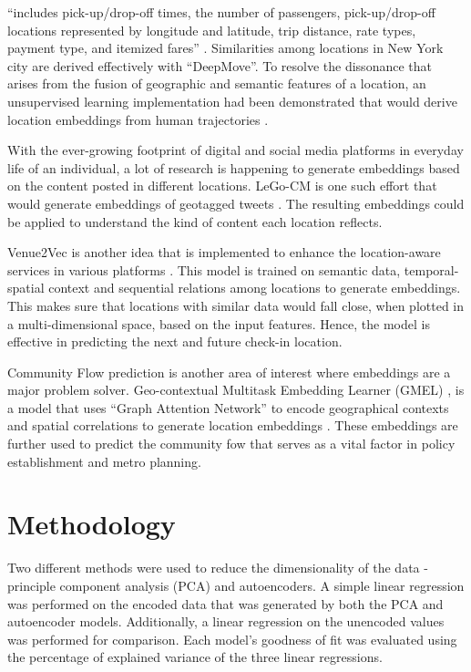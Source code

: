 \documentclass{article}
\begin{document}
“includes pick-up/drop-off times, the number of passengers, pick-up/drop-off locations 
represented by longitude and latitude, trip distance, rate types, payment type, and
itemized fares” \parencite{DeepMove}. Similarities among locations in New York city are 
derived effectively with “DeepMove”. To resolve the dissonance that arises from the 
fusion of geographic and semantic features of a location, an unsupervised learning 
implementation had been demonstrated that would derive location embeddings from human 
trajectories \parencite{DisentangledLocationEmbeddings}. 
\par With the ever-growing 
footprint of digital and social media platforms in everyday life of an individual, a
lot of research is happening to generate embeddings based on the content posted in 
different locations. LeGo-CM is one such effort that would generate embeddings of 
geotagged tweets \parencite{GeotaggedTweets}. The resulting embeddings could be 
applied to understand the kind of content each location reflects. 
\par Venue2Vec is another 
idea that is implemented to enhance the location-aware services in various platforms 
\parencite{Venue2Vec}. This model is trained on semantic data, temporal-spatial context 
and sequential relations among locations to generate embeddings. This makes sure that 
locations with similar data would fall close, when plotted in a multi-dimensional space,
based on the input features. Hence, the model is effective in predicting the next and  
future check-in location. 
\par Community Flow prediction is another area of interest where
embeddings are a major problem solver. Geo-contextual Multitask Embedding Learner (GMEL)
, is a model that uses “Graph Attention Network” to encode geographical contexts and 
spatial correlations to generate location embeddings \parencite{CommutingFlowPrediction}.
These embeddings are further used to predict the community fow that serves as a vital
factor in policy establishment and metro planning.

\section{Methodology}

\par Two different methods were used to reduce the dimensionality of the data - principle component analysis (PCA) and autoencoders. A simple linear regression was performed on the encoded data that was generated by both the PCA and autoencoder models. Additionally, a linear regression on the unencoded values was performed for comparison. Each model's goodness of fit was evaluated using the percentage of explained variance of the three linear regressions.
\end{document}
